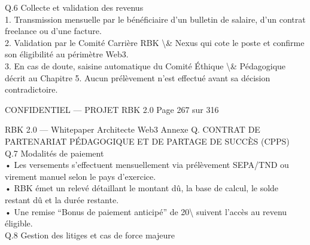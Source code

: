 \vspace{0.5em}
\vspace{0.5em}
Q.6 Collecte et validation des revenus\\
1. Transmission mensuelle par le bénéficiaire d’un bulletin de salaire, d’un contrat freelance ou d’une facture.\\
\vspace{0.5em}
2. Validation par le Comité Carrière RBK \textbackslash{}& Nexus qui cote le poste et confirme son éligibilité au périmètre Web3.\\
\vspace{0.5em}
3. En cas de doute, saisine automatique du Comité Éthique \textbackslash{}& Pédagogique décrit au Chapitre 5. Aucun prélèvement n’est effectué avant sa décision contradictoire.\\
\vspace{0.5em}
\vspace{0.5em}
\vspace{0.5em}
\vspace{0.5em}
\begin{confidential}CONFIDENTIEL — PROJET RBK 2.0                                            Page 267 sur 316\end{confidential}
RBK 2.0 — Whitepaper Architecte Web3                          Annexe Q. CONTRAT DE PARTENARIAT PÉDAGOGIQUE ET DE PARTAGE DE SUCCÈS (CPPS)\\
\vspace{0.5em}
\vspace{0.5em}
\vspace{0.5em}
Q.7 Modalités de paiement\\
• Les versements s’effectuent mensuellement via prélèvement SEPA/TND ou virement manuel selon le pays d’exercice.\\
\vspace{0.5em}
• RBK émet un relevé détaillant le montant dû, la base de calcul, le solde restant dû et la durée restante.\\
\vspace{0.5em}
• Une remise “Bonus de paiement anticipé” de 20\textbackslash{}%
suivent l’accès au revenu éligible.\\
\vspace{0.5em}
\vspace{0.5em}
\vspace{0.5em}
Q.8 Gestion des litiges et cas de force majeure\\
